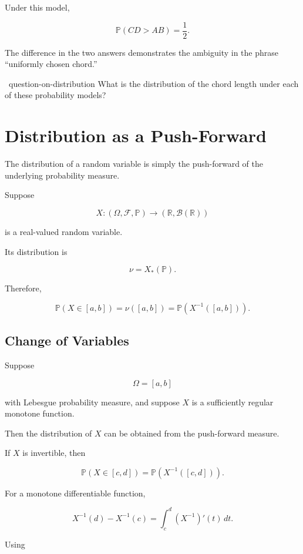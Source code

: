 Under this model,

\[
\mathbb{P}(CD>AB)=\frac12.
\]

The difference in the two answers demonstrates the ambiguity in the
phrase ``uniformly chosen chord.''

\begin{question}{~}{question-on-distribution}
What is the distribution of the chord length under each of these
probability models?
\end{question}

\section{Distribution as a Push-Forward}

The distribution of a random variable is simply the push-forward of
the underlying probability measure.

Suppose

\[
X:
(\Omega,\mathcal{F},\mathbb{P})
\longrightarrow
(\mathbb{R},\mathcal{B}(\mathbb{R}))
\]

is a real-valued random variable.

Its distribution is

\[
\nu=X_*(\mathbb{P}).
\]

Therefore,

\[
\mathbb{P}(X\in[a,b])
=
\nu([a,b])
=
\mathbb{P}
\left(
X^{-1}([a,b])
\right).
\]

\subsection{Change of Variables}

Suppose

\[
\Omega=[a,b]
\]

with Lebesgue probability measure, and suppose $X$ is a sufficiently
regular monotone function.

Then the distribution of $X$ can be obtained from the push-forward
measure.

If $X$ is invertible, then

\[
\mathbb{P}(X\in[c,d])
=
\mathbb{P}
\left(
X^{-1}([c,d])
\right).
\]

For a monotone differentiable function,

\[
X^{-1}(d)-X^{-1}(c)
=
\int_c^d
(X^{-1})'(t)\,dt.
\]

Using


